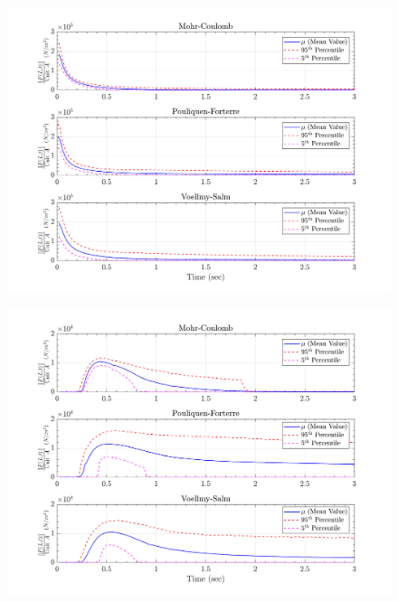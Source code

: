 \documentclass{article}
\begin{document}
\begin{figure}[H]
	\begin{minipage}[b]{0.5\linewidth}
    	\centering
    	\includegraphics[width=1\textwidth]{InclinedPlane/LocalRecords/Records/Fb_L1.png}
    	\label{fig:Ramp-L1-Fb}
	\end{minipage}
	\begin{minipage}[b]{0.5\linewidth}
		\centering
		\includegraphics[width=1\textwidth]{InclinedPlane/LocalRecords/Records/Fb_L8.png}
    	\label{fig:Ramp-L2-Fb}
    \end{minipage}
    

\end{figure}
\end{document}
